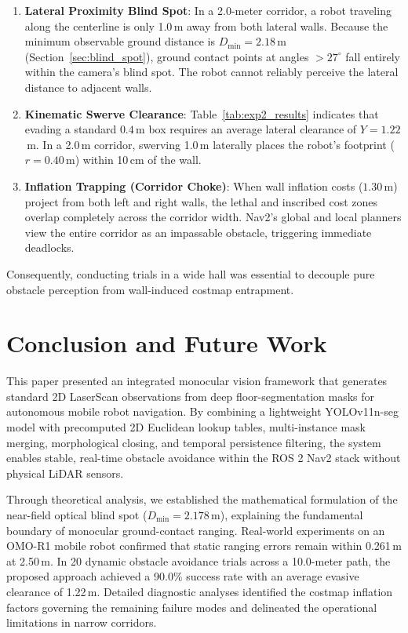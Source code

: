 \documentclass[preprint,12pt]{elsarticle}
\begin{document}
\begin{enumerate}
  \item \textbf{Lateral Proximity Blind Spot}: In a 2.0-meter corridor, a robot traveling along the centerline is only 1.0\,m away from both lateral walls. Because the minimum observable ground distance is $D_{\min} = 2.18$\,m (Section~\ref{sec:blind_spot}), ground contact points at angles $> 27^\circ$ fall entirely within the camera's blind spot. The robot cannot reliably perceive the lateral distance to adjacent walls.
  \item \textbf{Kinematic Swerve Clearance}: Table~\ref{tab:exp2_results} indicates that evading a standard $0.4$\,m box requires an average lateral clearance of $Y = 1.22$\,m. In a 2.0\,m corridor, swerving 1.0\,m laterally places the robot's footprint ($r=0.40$\,m) within 10\,cm of the wall.
  \item \textbf{Inflation Trapping (Corridor Choke)}: When wall inflation costs ($1.30$\,m) project from both left and right walls, the lethal and inscribed cost zones overlap completely across the corridor width. Nav2's global and local planners view the entire corridor as an impassable obstacle, triggering immediate deadlocks.
\end{enumerate}
Consequently, conducting trials in a wide hall was essential to decouple pure obstacle perception from wall-induced costmap entrapment.

\section{Conclusion and Future Work}
\label{sec:conclusion}

This paper presented an integrated monocular vision framework that generates standard 2D LaserScan observations from deep floor-segmentation masks for autonomous mobile robot navigation. By combining a lightweight YOLOv11n-seg model with precomputed 2D Euclidean lookup tables, multi-instance mask merging, morphological closing, and temporal persistence filtering, the system enables stable, real-time obstacle avoidance within the ROS 2 Nav2 stack without physical LiDAR sensors. 

Through theoretical analysis, we established the mathematical formulation of the near-field optical blind spot ($D_{\min} = 2.178$\,m), explaining the fundamental boundary of monocular ground-contact ranging. Real-world experiments on an OMO-R1 mobile robot confirmed that static ranging errors remain within 0.261\,m at 2.50\,m. In 20 dynamic obstacle avoidance trials across a 10.0-meter path, the proposed approach achieved a 90.0\% success rate with an average evasive clearance of 1.22\,m. Detailed diagnostic analyses identified the costmap inflation factors governing the remaining failure modes and delineated the operational limitations in narrow corridors.
\end{document}
